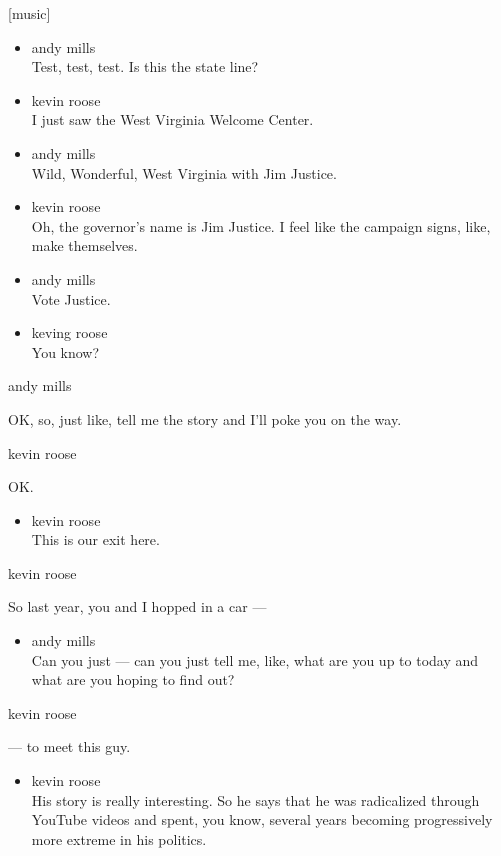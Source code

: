 {[}music{]}

\begin{itemize}
\item
  andy mills\\
  Test, test, test. Is this the state line?
\item
  kevin roose\\
  I just saw the West Virginia Welcome Center.
\item
  andy mills\\
  Wild, Wonderful, West Virginia with Jim Justice.
\item
  kevin roose\\
  Oh, the governor's name is Jim Justice. I feel like the campaign
  signs, like, make themselves.
\item
  andy mills\\
  Vote Justice.
\item
  keving roose\\
  You know?
\end{itemize}

andy mills

OK, so, just like, tell me the story and I'll poke you on the way.

kevin roose

OK.

\begin{itemize}
\tightlist
\item
  kevin roose\\
  This is our exit here.
\end{itemize}

kevin roose

So last year, you and I hopped in a car ---

\begin{itemize}
\tightlist
\item
  andy mills\\
  Can you just --- can you just tell me, like, what are you up to today
  and what are you hoping to find out?
\end{itemize}

kevin roose

--- to meet this guy.

\begin{itemize}
\tightlist
\item
  kevin roose\\
  His story is really interesting. So he says that he was radicalized
  through YouTube videos and spent, you know, several years becoming
  progressively more extreme in his politics.
\end{itemize}

